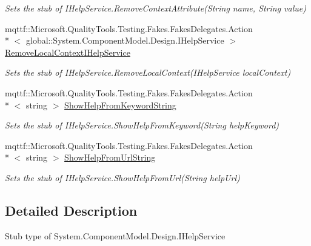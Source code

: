 \begin{DoxyCompactItemize}
\begin{DoxyCompactList}\small\item\em Sets the stub of I\-Help\-Service.\-Remove\-Context\-Attribute(\-String name, String value)\end{DoxyCompactList}\item 
mqttf\-::\-Microsoft.\-Quality\-Tools.\-Testing.\-Fakes.\-Fakes\-Delegates.\-Action\\*
$<$ global\-::\-System.\-Component\-Model.\-Design.\-I\-Help\-Service $>$ \hyperlink{class_system_1_1_component_model_1_1_design_1_1_fakes_1_1_stub_i_help_service_a35ba2de6e332947ede9f0bcb09ba812d}{Remove\-Local\-Context\-I\-Help\-Service}
\begin{DoxyCompactList}\small\item\em Sets the stub of I\-Help\-Service.\-Remove\-Local\-Context(\-I\-Help\-Service local\-Context)\end{DoxyCompactList}\item 
mqttf\-::\-Microsoft.\-Quality\-Tools.\-Testing.\-Fakes.\-Fakes\-Delegates.\-Action\\*
$<$ string $>$ \hyperlink{class_system_1_1_component_model_1_1_design_1_1_fakes_1_1_stub_i_help_service_adba2c3637062bb9460b4b2c2b078417c}{Show\-Help\-From\-Keyword\-String}
\begin{DoxyCompactList}\small\item\em Sets the stub of I\-Help\-Service.\-Show\-Help\-From\-Keyword(\-String help\-Keyword)\end{DoxyCompactList}\item 
mqttf\-::\-Microsoft.\-Quality\-Tools.\-Testing.\-Fakes.\-Fakes\-Delegates.\-Action\\*
$<$ string $>$ \hyperlink{class_system_1_1_component_model_1_1_design_1_1_fakes_1_1_stub_i_help_service_a4c15e8999d72069a48404c0c2e380b0f}{Show\-Help\-From\-Url\-String}
\begin{DoxyCompactList}\small\item\em Sets the stub of I\-Help\-Service.\-Show\-Help\-From\-Url(\-String help\-Url)\end{DoxyCompactList}\end{DoxyCompactItemize}


\subsection{Detailed Description}
Stub type of System.\-Component\-Model.\-Design.\-I\-Help\-Service



